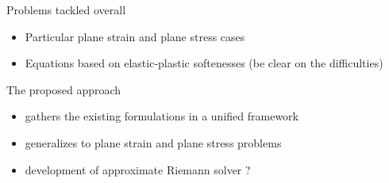 \begin{frame}
  \begin{block}{Problems tackled overall}
    \begin{itemize}
    \item Particular plane strain and plane stress cases \cite{Bleich,Ting69,Ting73,Li_planeStress_EP}
    \item Equations based on elastic-plastic softenesses (be clear on the difficulties)
    
    \end{itemize}
  \end{block}
  \begin{block}{The proposed approach}
    \begin{itemize}
    \item gathers the existing formulations in a unified framework
    \item generalizes to plane strain and plane stress problems
    \item development of approximate Riemann solver ?
    \end{itemize}
  \end{block}
\end{frame}

